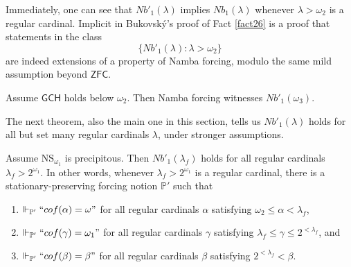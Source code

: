 \documentclass[12pt]{article}
\numberwithin{equation}{section}
\begin{document}
Immediately, one can see that $Nb'_1(\lambda)$ implies $Nb_1(\lambda)$ whenever $\lambda > \omega_2$ is a regular cardinal. Implicit in Bukovsk\'{y}'s proof of Fact \ref{fact26} is a proof that statements in the class
\begin{equation*}
    \{Nb'_1(\lambda) : \lambda > \omega_2\}
\end{equation*}
are indeed extensions of a property of Namba forcing, modulo the same mild assumption beyond $\mathsf{ZFC}$.

\begin{fact}
Assume $\mathsf{GCH}$ holds below $\omega_2$. Then Namba forcing witnesses $Nb'_1(\omega_3)$.
\end{fact}

The next theorem, also the main one in this section, tells us $Nb'_1(\lambda)$ holds for all but set many regular cardinals $\lambda$, under stronger assumptions.

\begin{thm}\label{notion1}
Assume $\mathrm{NS}_{\omega_1}$ is precipitous. Then $Nb'_1(\lambda_f)$ holds for all regular cardinals $\lambda_f > 2^{\omega_1}$. In other words, whenever $\lambda_f > 2^{\omega_1}$ is a regular cardinal, there is a stationary-preserving forcing notion $\mathbb{P}'$ such that 
\begin{enumerate}[label=(\arabic*)]
    \item\label{cond1} $\Vdash_{\mathbb{P}'} ``cof(\alpha) = \omega"$ for all regular cardinals $\alpha$ satisfying $\omega_2 \leq \alpha < \lambda_f$,
    \item\label{cond2} $\Vdash_{\mathbb{P}'} ``cof(\gamma) = \omega_1"$ for all regular cardinals $\gamma$ satisfying $\lambda_f \leq \gamma \leq 2^{< \lambda_f}$, and
    \item\label{cond3} $\Vdash_{\mathbb{P}'} ``cof(\beta) = \beta"$ for all regular cardinals $\beta$ satisfying $2^{< \lambda_f} < \beta$.
\end{enumerate}
\end{thm}
\end{document}
